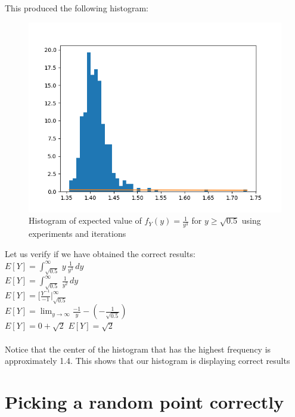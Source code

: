 \documentclass[answers]{exam}
\begin{document}
\begin{framed}
This produced the following histogram: 
\begin{figure}[H] %
    \centering
    \includegraphics[width= 1\textwidth]{Q2.3_expected_value_histogram.png}
    \caption{Histogram of expected value of $f_Y(y) = \frac{1}{y^3}$ for $y \geq \sqrt{0.5}$ using experiments and iterations}
\end{figure}

Let us verify if we have obtained the correct results: \\
$E[Y] = \int^{\infty}_{\sqrt{0.5}} \, y \, \frac{1}{y^3} \, dy $\\
$E[Y] = \int^{\infty}_{\sqrt{0.5}} \, \frac{1}{y^2} \, dy $\\
$E[Y] = \Bigr[ \frac{Y^{-1}}{ -1 } \Bigr|^{\infty}_{\sqrt{0.5}} $\\
$E[Y] = \lim_{y \to \infty} \frac{-1}{y} - (- \frac{1}{\sqrt{0.5}})$\\
$E[Y] = 0 + \sqrt{2}$
$E[Y] = \sqrt{2}$\\\\
Notice that the center of the histogram that has the highest frequency is approximately 1.4. This shows that our histogram is displaying correct results 

\end{framed}

\newpage

\section{Picking a random point correctly}
\end{document}
